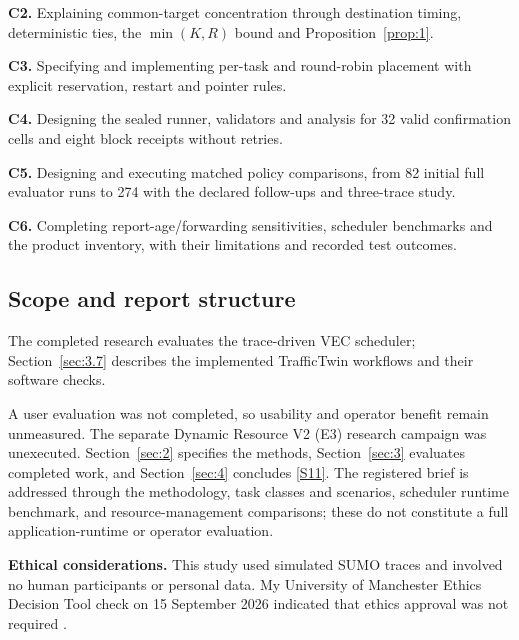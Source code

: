 \documentclass[12pt,a4paper]{article}
\begin{document}
\textbf{C2.} Explaining common-target concentration through destination timing, deterministic ties, the $\min(K,R)$ bound and Proposition~\ref{prop:1}.

\textbf{C3.} Specifying and implementing per-task and round-robin placement with explicit reservation, restart and pointer rules.

\textbf{C4.} Designing the sealed runner, validators and analysis for 32 valid confirmation cells and eight block receipts without retries.

\textbf{C5.} Designing and executing matched policy comparisons, from 82 initial full evaluator runs to 274 with the declared follow-ups and three-trace study.

\textbf{C6.} Completing report-age/forwarding sensitivities, scheduler benchmarks and the product inventory, with their limitations and recorded test outcomes.

\FloatBarrier
\subsection{Scope and report structure}\label{sec:1.4}

The completed research evaluates the trace-driven VEC scheduler; Section~\ref{sec:3.7} describes the implemented TrafficTwin workflows and their software checks.

A user evaluation was not completed, so usability and operator benefit remain unmeasured. The separate Dynamic Resource V2 (E3) research campaign was unexecuted. Section~\ref{sec:2} specifies the methods, Section~\ref{sec:3} evaluates completed work, and Section~\ref{sec:4} concludes \hyperref[source-s11]{[S11]}. The registered brief \cite{ref48} is addressed through the methodology, task classes and scenarios, scheduler runtime benchmark, and resource-management comparisons; these do not constitute a full application-runtime or operator evaluation.



\textbf{Ethical considerations.} This study used simulated SUMO traces and involved no human participants or personal data. My University of Manchester Ethics Decision Tool check on 15 September 2026 indicated that ethics approval was not required \cite{ref44}.
\end{document}
